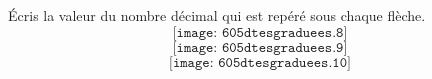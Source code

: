 \par\'Ecris la valeur du nombre décimal qui est repéré sous chaque flèche.
\[\texttt{[image: 605dtesgraduees.8]}\]
\[\texttt{[image: 605dtesgraduees.9]}\]
\[\texttt{[image: 605dtesgraduees.10]}\]